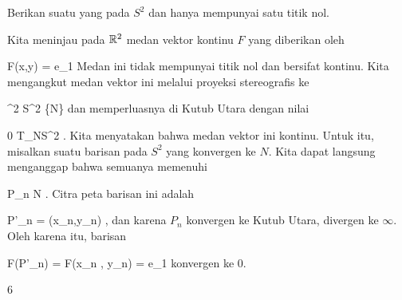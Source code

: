 {

Berikan suatu
 yang
pada $S^2$ dan hanya mempunyai satu titik nol.

}
{

Kita meninjau pada ${\mathbb R}^2$ medan vektor kontinu $F$ yang diberikan oleh

\mavergleichskettedisp
{\vergleichskette
{F(x,y)
}
{ =} { {  }  e_1
}
{ } {
}
{ } {
}
{ } {
}
}
{}{}{}
Medan ini tidak mempunyai titik nol dan bersifat kontinu. Kita mengangkut medan vektor ini melalui proyeksi stereografis ke

\mavergleichskette
{\vergleichskette
{  \R^2
}
{ \cong }{ S^2 \setminus \{N\}
}
{  }{
}
{    }{
}
{   }{
}
}
{}{}{}
dan memperluasnya di Kutub Utara dengan nilai

\mavergleichskette
{\vergleichskette
{ 0
}
{ \in }{  T_NS^2
}
{  }{
}
{    }{
}
{   }{
}
}
{}{}{.}
Kita menyatakan bahwa medan vektor ini kontinu. Untuk itu, misalkan
 suatu barisan pada $S^2$ yang konvergen ke $N$. Kita dapat langsung menganggap bahwa semuanya memenuhi

\mavergleichskette
{\vergleichskette
{P_n
}
{ \neq }{N
}
{  }{
}
{    }{
}
{   }{
}
}
{}{}{}
. Citra peta barisan ini adalah

\mavergleichskettedisp
{\vergleichskette
{P'_n
}
{ =} { (x_n,y_n)
}
{ } {
}
{ } {
}
{ } {
}
}
{}{}{,}
dan karena $P_n$ konvergen ke Kutub Utara,
 divergen ke $\infty$. Oleh karena itu, barisan

\mavergleichskettedisp
{\vergleichskette
{ F(P'_n)
}
{ =} { F(x_n , y_n)
}
{ =} { {  } e_1
}
{ } {
}
{ } {
}
}
{}{}{}
konvergen ke $0$.

 }



{6}

